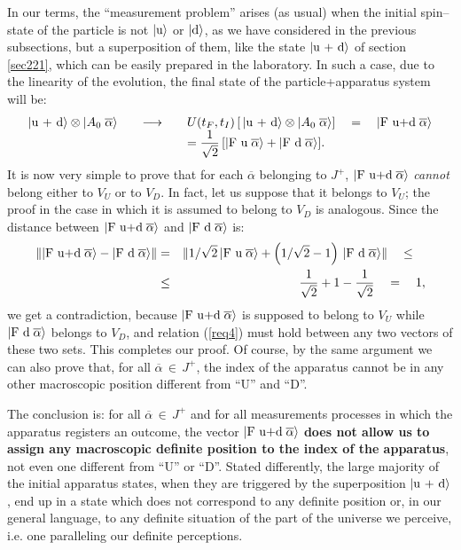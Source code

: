 \documentclass[12pt]{article}
\begin{document}
In our terms, the ``measurement problem'' arises (as usual) when
the initial spin--state of the particle is not
$|\makebox{u}\rangle$ or $|\makebox{d}\rangle$, as we have
considered in the previous subsections, but a superposition of
them, like the state $|\makebox{u + d}\rangle$ of section
\ref{sec221}, which can be easily prepared in the laboratory. In
such a case, due to the linearity of the evolution, the final
state of the particle+apparatus system will be:
\[
\begin{array}{lcl}
|\makebox{u +
d}\rangle\otimes|\makebox{$A_{0}$}\;\overline{\alpha} \rangle
\quad & \longrightarrow & \quad U(t_{F}, t_{I})\left[\,
|\makebox{u + d}\rangle\otimes|
\makebox{$A_{0}$}\;\overline{\alpha} \rangle \right]\quad = \quad
|\makebox{F u+d}\;\overline{\alpha}
\rangle\\
& & \quad= {\displaystyle \frac{1}{\sqrt{2}}\left[ |\makebox{F
u}\;\overline{\alpha}\rangle + |\makebox{F
d}\;\overline{\alpha}\rangle \right]}.
\end{array}
\]
It is now very simple to prove that for each $\overline{\alpha}$
belonging to $J^{+}$, $|\makebox{F u+d}\;\overline{\alpha}\rangle$
{\it cannot} belong either to $V_{U}$ or to $V_{D}$. In fact, let
us suppose that it belongs to $V_{U}$; the proof in the case in
which it is assumed to belong to $V_{D}$ is analogous. Since the
distance between $|\makebox{F u+d}\;\overline{\alpha}\rangle$  and
$|\makebox{F d}\;\overline{\alpha}\rangle$ is:
\begin{eqnarray*}
\| |\makebox{F u+d}\;\overline{\alpha}\rangle - |\makebox{F
d}\;\overline{\alpha}\rangle \| & = & \| 1/\sqrt{2}\, |\makebox{F
u}\;\overline{\alpha}\rangle + \left( 1/\sqrt{2} - 1\right) \,
|\makebox{F d}\;\overline{\alpha}\rangle \| \quad \leq \quad \\
& \leq & \frac{1}{\sqrt{2}} + 1 - \frac{1}{\sqrt{2}} \quad = \quad
1,
\end{eqnarray*}
we get a contradiction, because $|\makebox{F u+d}\;
\overline{\alpha}\rangle$ is supposed to belong to $V_{U}$ while
$|\makebox{F d}\;\overline{\alpha}\rangle$ belongs to $V_{D}$, and
relation (\ref{req4}) must hold between any two vectors of these
two sets. This completes our proof. Of course, by the same
argument we can also prove that, for all
$\overline{\alpha}\,\in\,J^{+}$, the index of the apparatus cannot
be in any other macroscopic position different from ``U'' and
``D''.

The conclusion is: for all $\overline{\alpha}\,\in\,J^{+}$ and for
all measurements processes in which the apparatus registers an
outcome, the vector $|\makebox{F u+d}\;\overline{\alpha}\rangle$
{\bf does not allow us to assign  any macroscopic definite
position to the index  of the apparatus}, not even  one different
from ``U'' or ``D''. Stated differently, the large majority of the
initial apparatus states, when they are triggered by the
superposition $|\makebox{u + d}\rangle$, end up in a state which
does not correspond to any definite position or, in our general
language, to any definite situation of the part of the universe we
perceive, i.e. one paralleling our definite perceptions.
\end{document}
